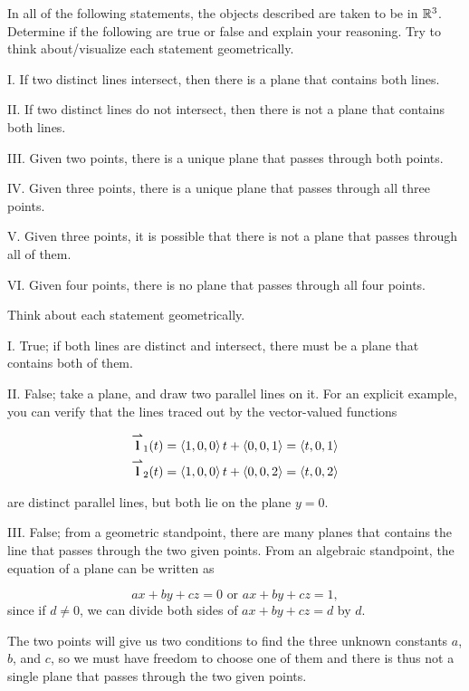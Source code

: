 \documentclass[noauthor]{ximera}
\begin{document}
\begin{problem}

In all of the following statements, the objects described are taken to be in $\mathbb R^3$.  Determine if the following are true or false and explain your reasoning.  Try to think about/visualize each statement geometrically.

I. If two distinct lines intersect, then there is a plane that contains both lines.

II. If two distinct lines do not intersect, then there is not a plane that contains both lines.

III. Given two points, there is a unique plane that passes through both points.

IV. Given three points, there is a unique plane that passes through all three points.

V. Given three points, it is possible that there is not a plane that passes through all of them.

VI. Given four points, there is no plane that passes through all four points.

\begin{freeResponse}
Think about each statement geometrically.

I. True; if both lines are distinct and intersect, there must be a plane that contains both of them.  

II. False; take a plane, and draw two parallel lines on it.  For an explicit example, you can verify that the lines traced out by the vector-valued functions

\begin{align*}
{\overset{\boldsymbol{\rightharpoonup}}{\mathbf{l}}}_1(t) = \left\langle 1,0,0\right\rangle t+ \left\langle 0,0,1\right\rangle = \left\langle t,0,1\right\rangle \\
{\overset{\boldsymbol{\rightharpoonup}}{\mathbf{l}}}_2(t) = \left\langle 1,0,0\right\rangle t+ \left\langle 0,0,2\right\rangle = \left\langle t,0,2\right\rangle \\
\end{align*}

 are distinct parallel lines, but both lie on the plane $y=0$.
 
III. False; from a geometric standpoint, there are many planes that contains the line that passes through the two given points.  From an algebraic standpoint, the equation of a plane can be written as 

\[
ax+by+cz=0 \textrm{ or } ax+by+cz=1,
\]
since if $d \neq 0$, we can divide both sides of $ax+by+cz=d$ by $d$.

The two points will give us two conditions to find the three unknown constants $a$, $b$, and $c$, so we must have freedom to choose one of them and there is thus not a single plane that passes through the two given points.
 

\end{freeResponse}
\end{problem}
\end{document}
